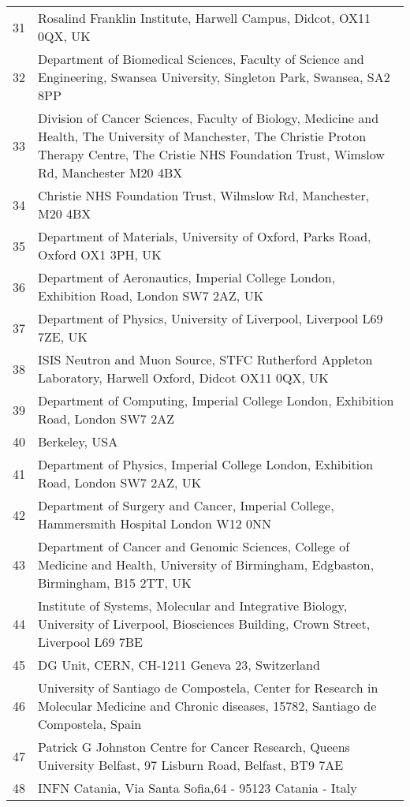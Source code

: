 {\begin{tabular}{ c p{15cm} }
     31 & Rosalind Franklin Institute, Harwell Campus, Didcot, OX11 0QX, UK\\
     32 & Department of Biomedical Sciences, Faculty of Science and Engineering, Swansea University, Singleton Park, Swansea, SA2 8PP\\
     33 & Division of Cancer Sciences, Faculty of Biology, Medicine and Health, The University of Manchester, The Christie Proton Therapy Centre, The Cristie NHS Foundation Trust, Wimslow Rd, Manchester M20 4BX\\
     34 & Christie NHS Foundation Trust, Wilmslow Rd, Manchester, M20 4BX\\
     35 & Department of Materials, University of Oxford, Parks Road, Oxford OX1 3PH, UK\\
     36 & Department of Aeronautics, Imperial College London, Exhibition Road, London SW7 2AZ, UK\\
     37 & Department of Physics, University of Liverpool, Liverpool L69 7ZE, UK\\
     38 & ISIS Neutron and Muon Source, STFC Rutherford Appleton Laboratory, Harwell Oxford, Didcot OX11 0QX, UK\\
     39 & Department of Computing, Imperial College London, Exhibition Road, London SW7 2AZ\\
     40 & Berkeley, USA\\
     41 & Department of Physics, Imperial College London, Exhibition Road, London SW7 2AZ, UK\\
     42 & Department of Surgery and Cancer, Imperial College, Hammersmith Hospital London W12 0NN\\
     43 & Department of Cancer and Genomic Sciences, College of Medicine and Health, University of Birmingham, Edgbaston, Birmingham, B15 2TT, UK\\
     44 & Institute of Systems, Molecular and Integrative Biology, University of Liverpool, Biosciences Building, Crown Street, Liverpool L69 7BE\\
     45 & DG Unit, CERN, CH-1211 Geneva 23, Switzerland\\
     46 & University of Santiago de Compostela, Center for Research in Molecular Medicine and Chronic diseases, 15782, Santiago de Compostela, Spain\\
     47 & Patrick G Johnston Centre for Cancer Research, Queens University Belfast, 97 Lisburn Road, Belfast, BT9 7AE\\
     48 & INFN Catania, Via Santa Sofia,64 - 95123 Catania - Italy\\

\end{tabular}}
